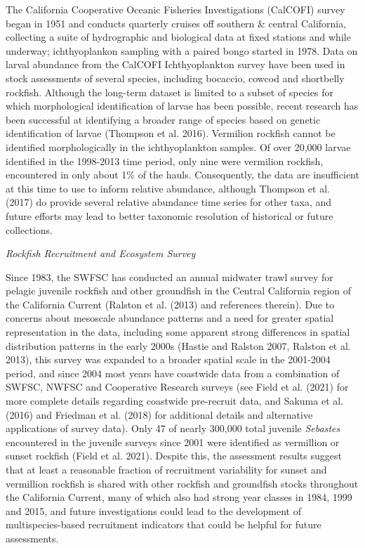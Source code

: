 \documentclass[
  english,
  a4paper,
]{article}
\begin{document}
The California Cooperative Oceanic Fisheries Investigations (CalCOFI) survey began in 1951 and conducts quarterly cruises off southern \& central California, collecting a suite of hydrographic and biological data at fixed stations and while underway; ichthyoplankon sampling with a paired bongo started in 1978.
Data on larval abundance from the CalCOFI Ichthyoplankton survey have been used in
stock assessments of several species, including bocaccio, cowcod and shortbelly
rockfish. Although the long-term dataset is limited to a subset of species
for which morphological identification of larvae has been possible, recent research
has been successful at identifying a broader range of species based on genetic
identification of larvae (Thompson et al. 2016).
Vermilion rockfish cannot be identified morphologically in the ichthyoplankton
samples. Of over 20,000 larvae identified in the 1998-2013 time period, only nine
were vermilion rockfish, encountered in only about 1\% of the hauls. Consequently,
the data are insufficient at this time to use to inform relative abundance, although Thompson et al. (2017) do provide several relative abundance time series for other taxa, and
future efforts may lead to better taxonomic resolution of historical or future collections.

\emph{Rockfish Recruitment and Ecosystem Survey}

Since 1983, the SWFSC has conducted an annual midwater trawl survey for pelagic
juvenile rockfish and other groundfish in the Central California region of the
California Current (Ralston et al. (2013) and references therein). Due to concerns
about mesoscale abundance patterns and a need for greater spatial representation
in the data, including some apparent strong differences in spatial distribution
patterns in the early 2000s (Hastie and Ralston 2007, Ralston et al. 2013), this survey was expanded
to a broader spatial scale in the 2001-2004 period, and since 2004 most years have
coastwide data from a combination of SWFSC, NWFSC and Cooperative Research surveys
(see Field et al. (2021) for more complete details regarding coastwide
pre-recruit data, and Sakuma et al. (2016) and Friedman et al. (2018)
for additional details and alternative applications of survey data). Only 47 of nearly 300,000 total juvenile \emph{Sebastes} encountered in the juvenile surveys since 2001 were identified as vermillion or sunset rockfish (Field et al. 2021). Despite this, the assessment results suggest that at least a reasonable fraction of recruitment variability for sunset and vermillion rockfish is shared with other rockfish and groundfish stocks throughout the California Current, many of which also had strong year classes in 1984, 1999 and 2015, and future investigations could lead to the development of multispecies-based recruitment indicators that could be helpful for future assessments.
\end{document}
